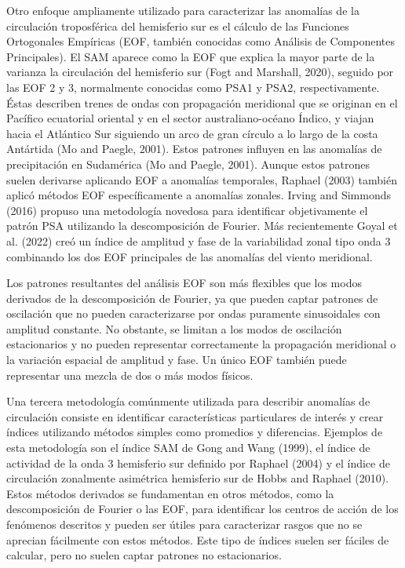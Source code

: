 \documentclass[12pt,oneside]{reedthesis}
\begin{document}
Otro enfoque ampliamente utilizado para caracterizar las anomalías de la circulación troposférica del hemisferio sur es el cálculo de las Funciones Ortogonales Empíricas (EOF, también conocidas como Análisis de Componentes Principales).
El SAM aparece como la EOF que explica la mayor parte de la varianza la circulación del hemisferio sur (Fogt and Marshall, 2020), seguido por las EOF 2 y 3, normalmente conocidas como PSA1 y PSA2, respectivamente.
Éstas describen trenes de ondas con propagación meridional que se originan en el Pacífico ecuatorial oriental y en el sector australiano-océano Índico, y viajan hacia el Atlántico Sur siguiendo un arco de gran círculo a lo largo de la costa Antártida (Mo and Paegle, 2001).
Estos patrones influyen en las anomalías de precipitación en Sudamérica (Mo and Paegle, 2001).
Aunque estos patrones suelen derivarse aplicando EOF a anomalías temporales, Raphael (2003) también aplicó métodos EOF específicamente a anomalías zonales.
Irving and Simmonds (2016) propuso una metodología novedosa para identificar objetivamente el patrón PSA utilizando la descomposición de Fourier.
Más recientemente Goyal et al. (2022) creó un índice de amplitud y fase de la variabilidad zonal tipo onda 3 combinando los dos EOF principales de las anomalías del viento meridional.

Los patrones resultantes del análisis EOF son más flexibles que los modos derivados de la descomposición de Fourier, ya que pueden captar patrones de oscilación que no pueden caracterizarse por ondas puramente sinusoidales con amplitud constante.
No obstante, se limitan a los modos de oscilación estacionarios y no pueden representar correctamente la propagación meridional o la variación espacial de amplitud y fase.
Un único EOF también puede representar una mezcla de dos o más modos físicos.

Una tercera metodología comúnmente utilizada para describir anomalías de circulación consiste en identificar características particulares de interés y crear índices utilizando métodos simples como promedios y diferencias.
Ejemplos de esta metodología son el índice SAM de Gong and Wang (1999), el índice de actividad de la onda 3 hemisferio sur definido por Raphael (2004) y el índice de circulación zonalmente asimétrica hemisferio sur de Hobbs and Raphael (2010).
Estos métodos derivados se fundamentan en otros métodos, como la descomposición de Fourier o las EOF, para identificar los centros de acción de los fenómenos descritos y pueden ser útiles para caracterizar rasgos que no se aprecian fácilmente con estos métodos.
Este tipo de índices suelen ser fáciles de calcular, pero no suelen captar patrones no estacionarios.
\end{document}
